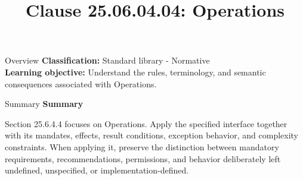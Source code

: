 \documentclass[10pt,letterpaper]{article}
\title{Clause 25.06.04.04: Operations}
\author{}
\date{}
\begin{document}
\maketitle
\begin{CornellOverviewBox}{Overview}
\textbf{Classification:} Standard library - Normative\\[2pt]
\textbf{Learning objective:} Understand the rules, terminology, and semantic consequences associated with Operations.
\end{CornellOverviewBox}\begin{CornellSummaryBox}{Summary}
{\sffamily\bfseries\color{Accent} Summary}\par\vspace{3pt}Section 25.6.4.4 focuses on Operations. Apply the specified interface together with its mandates, effects, result conditions, exception behavior, and complexity constraints. When applying it, preserve the distinction between mandatory requirements, recommendations, permissions, and behavior deliberately left undefined, unspecified, or implementation-defined.
\end{CornellSummaryBox}
\end{document}
